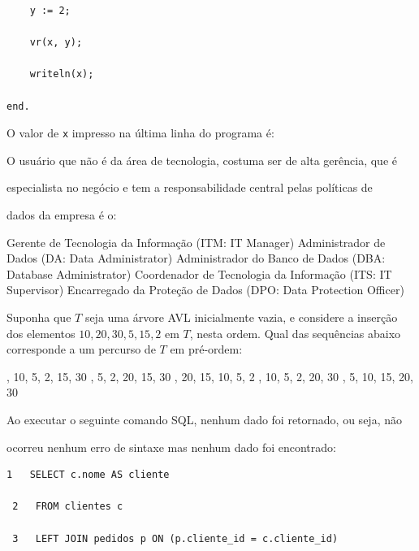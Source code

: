 \documentclass[12pt, addpoints]{exam}
\begin{document}
\begin{questions}
\begin{verbatim}
    y := 2;

    vr(x, y);

    writeln(x);

end.

\end{verbatim}



O valor de \texttt{x} impresso na última linha do programa é:
\begin{choices}
\end{choices}

\question

O usuário que não é da área de tecnologia, costuma ser de alta gerência, que é

especialista no negócio e tem a responsabilidade central pelas políticas de

dados da empresa é o:
\begin{choices}
\choice Gerente de Tecnologia da Informação (ITM: IT Manager)
\choice Administrador de Dados (DA: Data Administrator)
\choice Administrador do Banco de Dados (DBA: Database Administrator)
\choice Coordenador de Tecnologia da Informação (ITS: IT Supervisor)
\choice Encarregado da Proteção de Dados (DPO: Data Protection Officer)
\end{choices}

\question

Suponha que \( T \) seja uma árvore AVL inicialmente vazia, e considere a inserção dos elementos \(10, 20, 30, 5, 15, 2\) em \( T \), nesta ordem. Qual das sequências abaixo corresponde a um percurso de \( T \) em pré-ordem:
\begin{choices}
, 10, 5, 2, 15, 30
, 5, 2, 20, 15, 30
, 20, 15, 10, 5, 2
, 10, 5, 2, 20, 30
, 5, 10, 15, 20, 30
\end{choices}

\question

Ao executar o seguinte comando SQL, nenhum dado foi retornado, ou seja, não

ocorreu nenhum erro de sintaxe mas nenhum dado foi encontrado:

\begin{tcolorbox}

 \begin{verbatim}1   SELECT c.nome AS cliente

 2   FROM clientes c

 3   LEFT JOIN pedidos p ON (p.cliente_id = c.cliente_id)


\end{verbatim}
\end{tcolorbox}
\end{questions}
\end{document}

